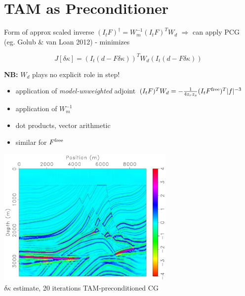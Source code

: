 \documentclass[xcolor=dvipsnames,12pt,aspectratio=169]{beamer}
\begin{document}
\section{TAM as Preconditioner}

\begin{frame}
Form of approx scaled inverse $(I_tF)^{\dagger} = W_m^{-1}(I_tF)^TW_d$ $\Rightarrow$ can apply
PCG (eg. Golub \& van Loan 2012) - minimizes

\[
J[\delta \kappa] = (I_t (d-F\delta \kappa))^T W_d (I_t(d-F\delta \kappa))
\]

{\bf NB:} $W_d$ plays no explicit role in step!

\begin{itemize}
\item application of {\em model-unweighted} adjoint $(I_tF)^TW_d = -\frac{1}{4 z_r z_s}(I_tF^{\rm free})^T|f|^{-3}$
\item application of $W_m^{-1}$
\item dot products, vector arithmetic
\item similar for $F^{\rm free}$
\end{itemize}
\end{frame}

\begin{frame}
\vspace{-0.62cm}
\begin{center}
\includegraphics[height=6.8cm]{Fig/fine1bulkinvp1it20}\\
$\delta \kappa$ estimate, 20 iterations TAM-preconditioned CG
\end{center}
\end{frame}
\end{document}
